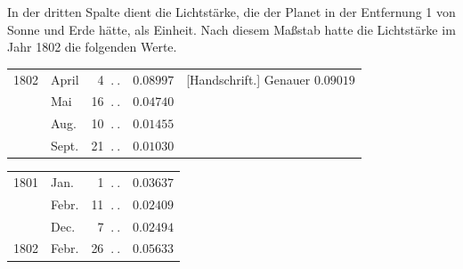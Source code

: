 In der dritten Spalte dient die Lichtstärke, die der Planet in der Entfernung 1 von Sonne und Erde hätte, als Einheit. Nach diesem Maßstab hatte die Lichtstärke im Jahr 1802 die folgenden Werte.
\begin{center}
\begingroup\small
\begin{tabular}{llr r l}
1802&April&4 $\ .\ .$&$0.08997$&[Handschrift.] Genauer $0.09019$\\
&Mai&16 $\ .\ .$&$0.04740$&\\
&Aug.&10 $\ .\ .$&$0.01455$&\\
&Sept.&21 $\ .\ .$&$0.01030$&
\end{tabular}\par\medskip
\begin{tabular}{llr r}
1801&Jan.&1 $\ .\ .$&$0.03637$\\
&Febr.&11 $\ .\ .$&$0.02409$\\
&Dec.&7 $\ .\ .$&$0.02494$\\
1802&Febr.&26 $\ .\ .$&$0.05633$
\end{tabular}\endgroup
\end{center}
\begin{flushright}\end{flushright}

